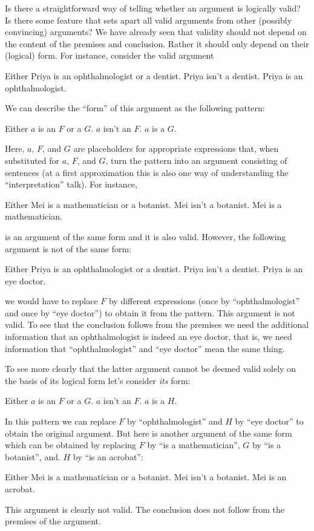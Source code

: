 Is there a straightforward way of telling whether an argument is logically valid? Is there some feature that sets apart all valid arguments from other (possibly convincing) arguments? We have already seen that validity should not depend on the content of the premises and conclusion. Rather it should only depend on their (logical) form. For instance, consider the valid argument
\begin{earg}
	\prem Either Priya is an ophthalmologist or a dentist.
	\prem Priya isn't a dentist.
	\conc Priya is an ophthalmologist.
\end{earg}
We can describe the ``form'' of this argument as the following pattern:
\begin{earg}
	\prem Either $a$ is an $F$ or a $G$.
	\prem $a$ isn't an $F$.
	\conc $a$ is a $G$.
\end{earg}
Here, $a$, $F$, and $G$ are placeholders for appropriate expressions that, when substituted for $a$, $F$, and $G$, turn the pattern into an argument consisting of sentences (at a first approximation this is also one way of understanding the ``interpretation'' talk). For instance,
\begin{earg}
	\prem Either Mei is a mathematician or a botanist.
	\prem Mei isn't a botanist.
	\conc Mei is a mathematician.
\end{earg}
is an argument of the same form and it is also valid. However, the following argument is not of the same form:
\begin{earg}
	\prem Either Priya is an ophthalmologist or a dentist.
	\prem Priya isn't a dentist.
	\conc Priya is an eye doctor.
\end{earg}
we would have to replace $F$ by different expressions (once by ``ophthalmologist'' and once by ``eye doctor'') to obtain it from the pattern. This argument is not valid. To see that the conclusion follows from the premises we need the additional information that an ophthalmologist is indeed an eye doctor, that is, we need information that ``ophthalmologist'' and ``eye doctor'' mean the same thing.

To see more clearly that the latter argument cannot be deemed valid solely on the basis of its logical form let's consider \emph{its} form:
\begin{earg}
	\prem Either $a$ is an $F$ or a $G$.
	\prem $a$ isn't an $F$.
	\conc $a$ is a $H$.
\end{earg}
In this pattern we can replace $F$ by ``ophthalmologist'' and $H$ by ``eye doctor'' to obtain the original argument.  But here is another argument of the same form which can be obtained by replacing $F$ by ``is a mathematician'', $G$ by ``is a botanist'', and. $H$ by ``is an acrobat'':
\begin{earg}
	\prem Either Mei is a mathematician or a botanist.
	\prem Mei isn't a botanist.
	\conc Mei is an acrobat.
\end{earg}
This argument is clearly not valid. The conclusion does not follow from the premises of the argument.

